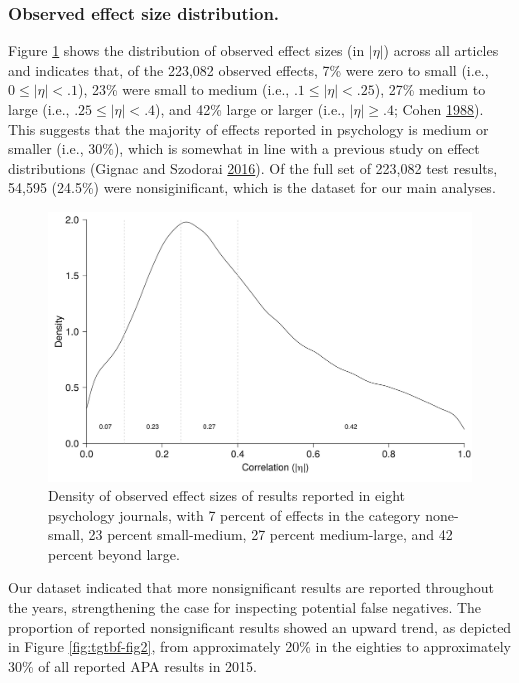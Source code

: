 \documentclass[a5paper]{book}
\begin{document}
\subsubsection{Observed effect size
distribution.}\label{observed-effect-size-distribution.}

Figure \ref{fig:tgtbf-fig1} shows the distribution of observed effect
sizes (in \(|\eta|\)) across all articles and indicates that, of the
223,082 observed effects, 7\% were zero to small (i.e.,
\(0\leq|\eta|<.1\)), 23\% were small to medium (i.e.,
\(.1\leq|\eta|<.25\)), 27\% medium to large (i.e.,
\(.25\leq|\eta|<.4\)), and 42\% large or larger (i.e., \(|\eta|\geq.4\);
Cohen \protect\hyperlink{ref-isbn:9780805802832}{1988}). This suggests
that the majority of effects reported in psychology is medium or smaller
(i.e., 30\%), which is somewhat in line with a previous study on effect
distributions (Gignac and Szodorai
\protect\hyperlink{ref-doi:10.1016ux2fj.paid.2016.06.069}{2016}). Of the
full set of 223,082 test results, 54,595 (24.5\%) were nonsiginificant,
which is the dataset for our main analyses.

\begin{figure}[h]

{\centering \includegraphics[width=1\linewidth]{assets/figures/tgtbf-fig1.pdf.svg} 

}

\caption{Density of observed effect sizes of results reported in eight psychology journals, with 7 percent of effects in the category none-small, 23 percent small-medium, 27 percent medium-large, and 42 percent beyond large.}\label{fig:tgtbf-fig1}
\end{figure}

Our dataset indicated that more nonsignificant results are reported
throughout the years, strengthening the case for inspecting potential
false negatives. The proportion of reported nonsignificant results
showed an upward trend, as depicted in Figure \ref{fig:tgtbf-fig2}, from
approximately 20\% in the eighties to approximately 30\% of all reported
APA results in 2015.
\end{document}
